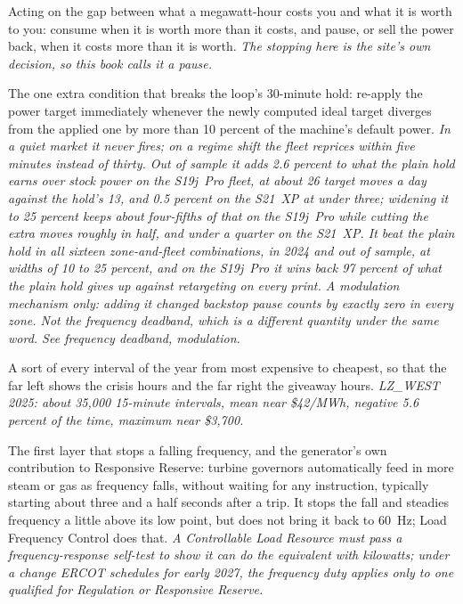 \begin{description}[leftmargin=0pt,style=unboxed,itemsep=0.35em,parsep=0.15em]
\item[price arbitrage] \hypertarget{glossary:price-arbitrage}{}Acting on the gap between what a megawatt-hour costs you and what it is worth to you: consume when it is worth more than it costs, and pause, or sell the power back, when it costs more than it is worth. \emph{The stopping here is the site's own decision, so this book calls it a pause.}
\item[price deadband] \hypertarget{glossary:price-deadband}{}The one extra condition that breaks the loop's 30-minute hold: re-apply the power target immediately whenever the newly computed ideal target diverges from the applied one by more than 10 percent of the machine's default power. \emph{In a quiet market it never fires; on a regime shift the fleet reprices within five minutes instead of thirty. Out of sample it adds 2.6 percent to what the plain hold earns over stock power on the S19j~Pro fleet, at about 26 target moves a day against the hold's 13, and 0.5 percent on the S21~XP at under three; widening it to 25 percent keeps about four-fifths of that on the S19j~Pro while cutting the extra moves roughly in half, and under a quarter on the S21~XP. It beat the plain hold in all sixteen zone-and-fleet combinations, in 2024 and out of sample, at widths of 10 to 25 percent, and on the S19j~Pro it wins back 97 percent of what the plain hold gives up against retargeting on every print. A modulation mechanism only: adding it changed backstop pause counts by exactly zero in every zone. Not the frequency deadband, which is a different quantity under the same word. See frequency deadband, modulation.}
\item[price duration curve] \hypertarget{glossary:price-duration-curve}{}A sort of every interval of the year from most expensive to cheapest, so that the far left shows the crisis hours and the far right the giveaway hours. \emph{LZ\_WEST 2025: about 35,000 15-minute intervals, mean near \$42/MWh, negative 5.6 percent of the time, maximum near \$3,700.}
\item[primary frequency response (PFR)] \hypertarget{glossary:primary-frequency-response}{}The first layer that stops a falling frequency, and the generator's own contribution to Responsive Reserve: turbine governors automatically feed in more steam or gas as frequency falls, without waiting for any instruction, typically starting about three and a half seconds after a trip. It stops the fall and steadies frequency a little above its low point, but does not bring it back to 60~Hz; Load Frequency Control does that. \emph{A Controllable Load Resource must pass a frequency-response self-test to show it can do the equivalent with kilowatts; under a change ERCOT schedules for early 2027, the frequency duty applies only to one qualified for Regulation or Responsive Reserve.}

\end{description}
